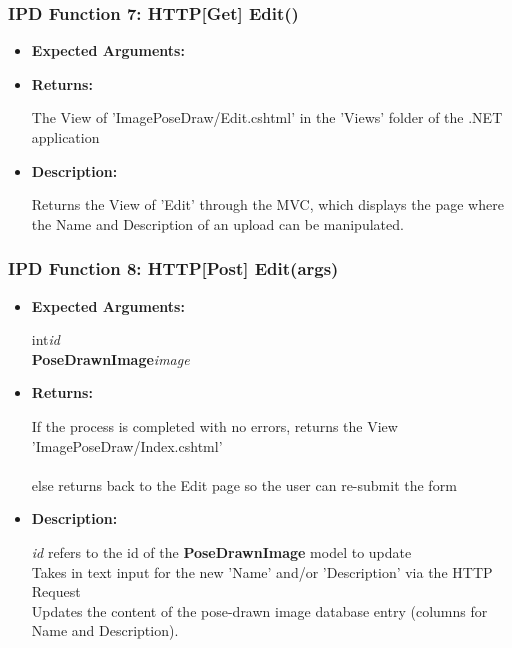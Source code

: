 \documentclass{scrreprt}
\begin{document}
\subsubsection{IPD Function 7: HTTP[Get] Edit()}
\begin{itemize}
    \item \textbf{Expected Arguments:}
    \item \textbf{Returns:}

    The View of 'ImagePoseDraw/Edit.cshtml' in the 'Views' folder of the .NET application

    \item \textbf{Description:}

    Returns the View of 'Edit' through the MVC, which displays the page where the Name and Description of an upload can be manipulated.
\end{itemize}


\subsubsection{IPD Function 8: HTTP[Post] Edit(args)}
\begin{itemize}
    \item \textbf{Expected Arguments:}

    int\quad\textit{id}
    \\
    \textbf{PoseDrawnImage}\quad\textit{image}

    \item \textbf{Returns:}

    If the process is completed with no errors, returns the View 'ImagePoseDraw/Index.cshtml'
    \\\\
    else returns back to the Edit page so the user can re-submit the form

    \item \textbf{Description:}

    \textit{id} refers to the id of the \textbf{PoseDrawnImage} model to update
    \\
    Takes in text input for the new 'Name' and/or 'Description' via the HTTP Request
    \\
    Updates the content of the pose-drawn image database entry (columns for Name and Description).

\end{itemize}
\end{document}
